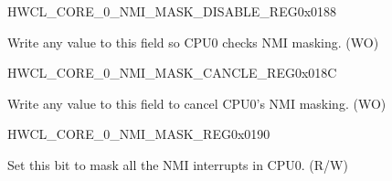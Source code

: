 \begin{register}{H}{WCL\_CORE\_0\_NMI\_MASK\_DISABLE\_REG}{0x0188}\label{regdesc:WCLCORE0NMIMASKDISABLEREG}
%
\regnewline%
\begin{regdesc}\begin{reglist}
\label{fielddesc:WCLCORE0NMIMASKDISABLE}\item [WCL\_CORE\_0\_NMI\_MASK\_DISABLE] Write any value to this field so CPU0 checks NMI masking. (WO)
\end{reglist}\end{regdesc}
\end{register}


\begin{register}{H}{WCL\_CORE\_0\_NMI\_MASK\_CANCLE\_REG}{0x018C}\label{regdesc:WCLCORE0NMIMASKCANCLEREG}
%
\regnewline%
\begin{regdesc}\begin{reglist}
\label{fielddesc:WCLCORE0NMIMASKCANCEL}\item [WCL\_CORE\_0\_NMI\_MASK\_CANCEL] Write any value to this field to cancel CPU0's NMI masking. (WO)
\end{reglist}\end{regdesc}
\end{register}


\begin{register}{H}{WCL\_CORE\_0\_NMI\_MASK\_REG}{0x0190}\label{regdesc:WCLCORE0NMIMASKREG}
%
%
\regnewline%
\begin{regdesc}\begin{reglist}
\label{fielddesc:WCLCORE0NMIMASK}\item [WCL\_CORE\_0\_NMI\_MASK] Set this bit to mask all the NMI interrupts in CPU0. (R/W)
\end{reglist}\end{regdesc}
\end{register}



